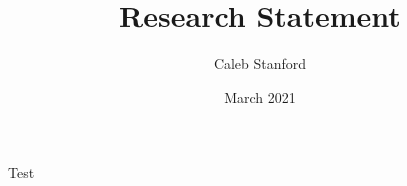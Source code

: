 \documentclass{article}
\title{Research Statement}
\author{Caleb Stanford}
\date{March 2021}
\begin{document}
\maketitle{}

Test~\cite{popl19}



\end{document}
